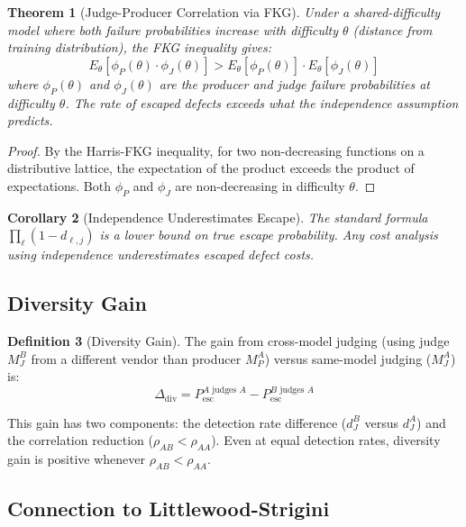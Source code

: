 \documentclass[11pt, a4paper]{article}
\newtheorem{theorem}{Theorem}[section]
\newtheorem{corollary}[theorem]{Corollary}
\theoremstyle{definition}
\newtheorem{definition}[theorem]{Definition}
\theoremstyle{remark}
\newcommand{\Pesc}{P_{\mathrm{esc}}}
\begin{document}
\begin{theorem}[Judge-Producer Correlation via FKG]
\label{thm:fkg}
Under a shared-difficulty model where both failure probabilities increase with difficulty $\theta$ (distance from training distribution), the FKG inequality \citep{fkg1971} gives:
\begin{equation}
E_\theta[\phi_P(\theta) \cdot \phi_J(\theta)] > E_\theta[\phi_P(\theta)] \cdot E_\theta[\phi_J(\theta)]
\end{equation}
where $\phi_P(\theta)$ and $\phi_J(\theta)$ are the producer and judge failure probabilities at difficulty $\theta$. The rate of escaped defects exceeds what the independence assumption predicts.
\end{theorem}

\begin{proof}
By the Harris-FKG inequality, for two non-decreasing functions on a distributive lattice, the expectation of the product exceeds the product of expectations. Both $\phi_P$ and $\phi_J$ are non-decreasing in difficulty $\theta$.
\end{proof}

\begin{corollary}[Independence Underestimates Escape]
\label{cor:underestimate}
The standard formula $\prod_\ell (1 - d_{\ell,j})$ is a lower bound on true escape probability. Any cost analysis using independence underestimates escaped defect costs.
\end{corollary}

\subsection{Diversity Gain}

\begin{definition}[Diversity Gain]
The gain from cross-model judging (using judge $M_J^B$ from a different vendor than producer $M_P^A$) versus same-model judging ($M_J^A$) is:
\begin{equation}
\Delta_{\mathrm{div}} = \Pesc^{A \text{ judges } A} - \Pesc^{B \text{ judges } A}
\end{equation}
\end{definition}

This gain has two components: the detection rate difference ($d_J^B$ versus $d_J^A$) and the correlation reduction ($\rho_{AB} < \rho_{AA}$). Even at equal detection rates, diversity gain is positive whenever $\rho_{AB} < \rho_{AA}$.

\subsection{Connection to Littlewood-Strigini}
\end{document}
